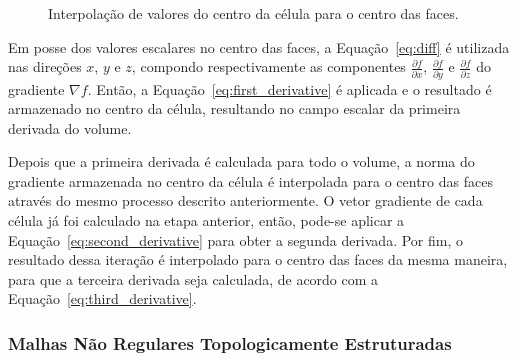 \begin{figure}[h]
	\centering
	\caption{Interpolação de valores do centro da célula para o centro das faces.}
	\label{fig:m_cubes}
\end{figure}
	
	Em posse dos valores escalares no centro das faces, a Equação~\eqref{eq:diff} é utilizada nas direções $ x $, $ y $ e $ z $, compondo respectivamente as componentes $ \frac{\partial f}{\partial x} $, $ \frac{\partial f}{\partial y} $ e $ \frac{\partial f}{\partial z} $ do gradiente $ \nabla f $. Então, a Equação~\eqref{eq:first_derivative} é aplicada e o resultado é armazenado no centro da célula, resultando no campo escalar da primeira derivada do volume. 
	
	Depois que a primeira derivada é calculada para todo o volume, a norma do gradiente armazenada no centro da célula é interpolada para o centro das faces através do mesmo processo descrito anteriormente. O vetor gradiente de cada célula já foi calculado na etapa anterior, então, pode-se aplicar a Equação~\eqref{eq:second_derivative} para obter a segunda derivada. Por fim, o resultado dessa iteração é interpolado para o centro das faces da mesma maneira, para que a terceira derivada seja calculada, de acordo com a Equação~\eqref{eq:third_derivative}.

\subsubsection{Malhas Não Regulares Topologicamente Estruturadas}
\label{subsec:my.nonstruct}

